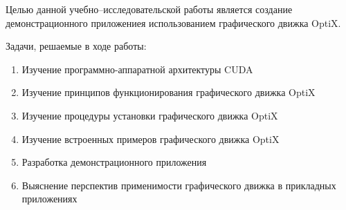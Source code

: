 Целью данной учебно--исследовательской работы является создание демонстрационного приложениея использованием графического движка OptiX.

Задачи, решаемые в ходе работы:
\begin{enumerate}
\item Изучение  программно-аппаратной архитектуры CUDA
\item Изучение принципов функционирования графического движка OptiX
\item Изучение процедуры установки графического движка OptiX
\item Изучение встроенных примеров графического движка OptiX
\item Разработка демонстрационного приложения
\item Выяснение перспектив применимости графического движка в прикладных приложениях
\end{enumerate}
